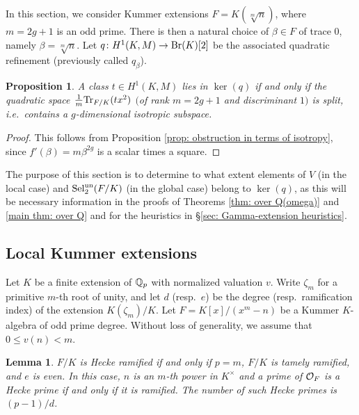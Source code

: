 \documentclass[11pt,a4paper]{amsart}
\def\Q{{\rm \mathbb{Q}}}
\def\O{{\rm \mathcal{O}}}
\def\un{{\rm un}}
\def\Tr{{\rm Tr}}
\def\Br{{\rm Br}}
\def\Sel{{\rm Sel}}
\numberwithin{equation}{section}
\newtheorem{lemma}[theorem]{Lemma}
\newtheorem{proposition}[theorem]{Proposition}
\begin{document}
In this section, we consider Kummer extensions $F = K(\sqrt[m]{n})$, where $m = 2g+1$ is an odd prime. 
 There is then a natural choice of $\beta \in F$ of trace $0$, namely $\beta = \sqrt[m]{n}$. Let $q \colon H^1(K, M) \to \Br(K)[2]$ be the associated quadratic refinement (previously called $q_\beta$). 

\begin{proposition}\label{prop: Kummer kernel condition}
A class $t \in H^1(K, M)$ lies in $\ker(q)$ if and only if the quadratic space $\frac{1}{m}\Tr_{F/K}(tx^2)$ $($of rank $m = 2g+1$ and discriminant $1)$ is split, i.e.\ contains a $g$-dimensional isotropic subspace. 
\end{proposition}
\begin{proof}
    This follows from Proposition \ref{prop: obstruction in terms of isotropy}, since $f'(\beta) = m\beta^{2g}$ is a scalar times a square. 
\end{proof}

The purpose of this section is to determine to what extent elements of $V$ (in the local case) and  $\Sel_2^\un(F/K)$ (in the global case) belong to $\ker(q)$, as this will be necessary information in the proofs of Theorems \ref{thm: over Q(omega)} and \ref{main thm: over Q} and for the heuristics in  \S\ref{sec: Gamma-extension heuristics}. 


\subsection{Local Kummer extensions}


Let $K$ be a finite extension of $\Q_p$ with normalized valuation $v$. Write $\zeta_m$ for a primitive $m$-th root of unity, and let $d$ (resp.\ $e$) be the degree (resp.\ ramification index) of the extension $K(\zeta_m)/K$.  Let $F = K[x]/(x^m - n)$ be a Kummer $K$-algebra of odd prime degree. Without loss of generality, we assume that $0 \leq v(n) < m$. 
\begin{lemma}\label{lem: Kummer Hecke ramification}
  $F/K$ is Hecke ramified if and only if $p = m$, $F/K$ is tamely ramified, and $e$ is even.  In this case, $n$ is an $m$-th power in $K^\times$ and a prime of $\O_F$ is a Hecke prime if and only if it is ramified. The number of such Hecke primes is $(p-1)/d$. 
\end{lemma}
\end{document}

